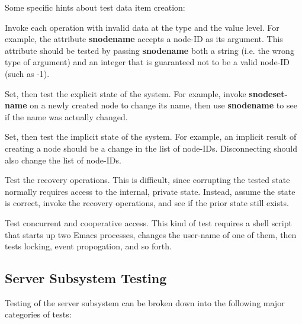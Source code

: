 Some specific hints about test data item creation:

\begin{itemizenoindent}

\item Invoke each operation with invalid data at the type and the value level.
    For example, the attribute {\bf s\STAR node\STAR name} accepts a node-ID as its
    argument.  This attribute should be tested by passing {\bf s\STAR node\STAR name}
    both a string (i.e. the wrong type of argument) and an integer that
    is guaranteed not to be a valid node-ID (such as -1).  

\item Set, then test the explicit state of the system.  For example,
    invoke {\bf s\STAR node\STAR set-name} on a newly created node to change its name, then use 
    {\bf s\STAR node\STAR name} to see if the name was actually changed.

\item Set, then test the implicit state of the system.  For example,
    an implicit result of creating a node should be a change in the list of 
    node-IDs.  Disconnecting should also change the list of node-IDs.

\item Test the recovery operations.  This is difficult, since corrupting 
    the tested state normally requires access to the internal, private state.
    Instead, assume the state is correct, invoke the recovery operations,
    and see if the prior state still exists.  

\item Test concurrent and cooperative access. This kind of test requires a 
    shell script that starts up two Emacs processes, changes the user-name of
    one of them, then tests locking, event propogation, and so forth.

\end{itemizenoindent}


\subsection{Server Subsystem Testing}

Testing of the server subsystem can be broken down into the following
major categories of tests:

